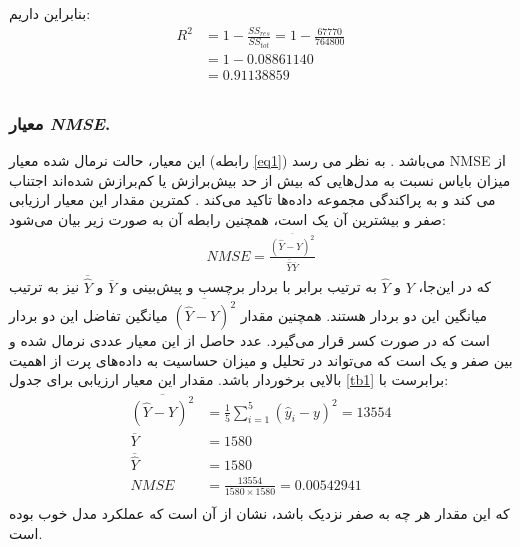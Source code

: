 \begin{redtext}
	بنابراین داریم:
	\begin{equation*}
		\begin{aligned}
			R^2 & = 1 - \frac{SS_{res}}{SS_{tot}} = 1 - \frac{67770}{764800} \\
			& =  1 - 0.08861140 \\
			& =  0.91138859 \\
		\end{aligned}
	\end{equation*}	
	
	\subsubsection{معیار \textit{NMSE}.}
	این معیار، حالت نرمال شده معیار  (رابطه \ref{eq1}) می‌باشد \cite{poli1993use}. به نظر می رسد NMSE از میزان بایاس نسبت به مدل‌هایی که بیش از حد بیش‌برازش یا کم‌برازش شده‌اند اجتناب می کند و به پراکندگی مجموعه داده‌ها تاکید می‌کند \cite{chang2004air}. کمترین مقدار این معیار ارزیابی صفر و بیشترین آن یک است، همچنین رابطه آن به صورت زیر بیان می‌شود:
	\begin{equation}
		\begin{aligned}
			NMSE = \frac{\overline{(\hat{Y} - Y)^2}} {\overline{\hat{Y}} \overline{Y}}
		\end{aligned}
		\label{eq5}
	\end{equation}
	که در این‌جا، $Y$ و $\hat{Y}$ به ترتیب برابر با بردار برچسب و پیش‌بینی و $\overline{Y}$ و $\overline{\hat{Y}}$ نیز به ترتیب میانگین این دو بردار هستند. همچنین مقدار $\overline{(\hat{Y} - Y)^2}$ میانگین تفاضل این دو بردار است که در صورت کسر قرار می‌گیرد. عدد حاصل از این معیار عددی نرمال شده و بین صفر و یک است که می‌تواند در تحلیل و میزان حساسیت به داده‌های پرت از اهمیت بالایی برخوردار باشد. مقدار این معیار ارزیابی برای جدول \ref{tb1} برابرست با:
	\begin{equation*}
		\begin{aligned}
			\overline{(\hat{Y} - Y)^2} & = \frac{1}{5} \sum_{i=1}^{5} (\hat{y}_i - y)^2 = 13554 \\
			\overline{Y} & = 1580 \\
			\overline{\hat{Y}} & = 1580 \\
			NMSE & = \frac{13554}{1580 \times 1580} = 0.00542941 \\
		\end{aligned}
	\end{equation*}	
	که این مقدار هر چه به صفر نزدیک باشد، نشان از آن است که عملکرد مدل خوب بوده است.
\end{redtext}
